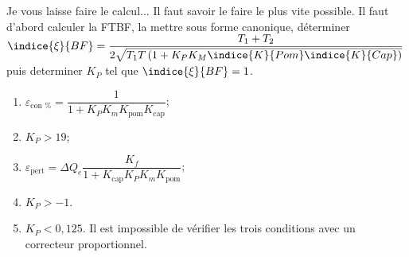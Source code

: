\ifprof
Je vous laisse faire le calcul... Il faut savoir le faire le plus vite possible.
Il faut d'abord calculer la FTBF, la mettre sous forme canonique, déterminer 
$\indice{\xi}{BF}=\dfrac{T_1+T_2}{2\sqrt{T_1T\left( 1+K_P K_M \indice{K}{Pom}\indice{K}{Cap}\right)}}$ puis
determiner $K_P$ tel que $\indice{\xi}{BF}=1$.

\else 
\fi
 

\ifprof
\else
\begin{solution}
\begin{enumerate}
  \item $\varepsilon_{\text{con \%}} = \dfrac{1}{1+K_PK_m K_{\text{pom}} K_{\text{cap}} }$;
  \item $K_P > 19$;
  \item $\varepsilon_{\text{pert}} = \Delta Q_e \dfrac{K_f}{1+K_{\text{cap}}K_PK_mK_{\text{pom}}}$;
  \item $K_P > -1$.%
  \item $K_P < 0,125$. Il est impossible de vérifier les trois conditions avec un correcteur proportionnel.
\end{enumerate}
\end{solution}


\fi